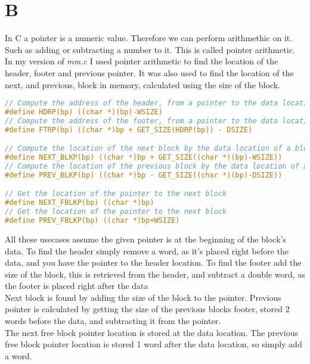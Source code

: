 \documentclass[11pt]{report}
\begin{document}
\section{B}
In C a pointer is a numeric value. Therefore we can perform arithmethic on it. Such as adding or subtracting a number to it. This is called pointer arithmetic.\\[1ex]

In my version of \textit{mm.c} I used pointer arithmetic to find the location of the header, footer and previous pointer. It was also used to find the location of the next, and previous, block in memory, calculated using the size of the block. 
\begin{lstlisting}[language=C]
// Compute the address of the header, from a pointer to the data location
#define HDRP(bp) ((char *)(bp)-WSIZE)
// Compute the address of the footer, from a pointer to the data location
#define FTRP(bp) ((char *)bp + GET_SIZE(HDRP(bp)) - DSIZE)

// Compute the location of the next block by the data location of a block
#define NEXT_BLKP(bp) ((char *)bp + GET_SIZE((char *)(bp)-WSIZE))
// Compute the location of the previous block by the data location of a block
#define PREV_BLKP(bp) ((char *)bp - GET_SIZE((char *)(bp)-DSIZE))

// Get the location of the pointer to the next block
#define NEXT_FBLKP(bp) ((char *)bp)
// Get the location of the pointer to the next block
#define PREV_FBLKP(bp) ((char *)bp+WSIZE)
\end{lstlisting}
All these usecases assume the given pointer is at the beginning of the block's data. To find the header simply remove a word, as it's placed right before the data, and you have the pointer to the header location. To find the footer add the size of the block, this is retrieved from the header, and subtract a double word, as the footer is placed right after the data\\[1ex]

Next block is found by adding the size of the block to the pointer. Previous pointer is calculated by getting the size of the previous blocks footer, stored 2 words before the data, and subtracting it from the pointer.\\[1ex]

The next free block pointer location is stored at the data location. The previous free block pointer location is stored 1 word after the data location, so simply add a word.
\end{document}
